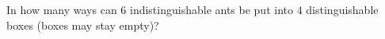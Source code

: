 In how many ways can $6$ indistinguishable ants be put into $4$ distinguishable boxes (boxes may stay empty)?
